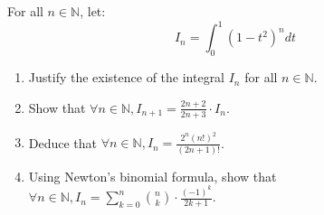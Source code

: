 \documentclass[12pt]{article}
\begin{document}
\newpage

\begin{answerbox}


\end{answerbox}

\newpage

\section{}
For all $n \in \mathbb{N}$, let:
$$I_n = \int_0^1 (1 - t^2)^n dt$$

\begin{enumerate}
    \item Justify the existence of the integral $I_n$ for all $n \in \mathbb{N}$.
    \item Show that $\forall n \in \mathbb{N}, I_{n+1} = \frac{2n + 2}{2n + 3} \cdot I_n$.
    \item Deduce that $\forall n \in \mathbb{N}, I_n = \frac{2^n(n!)^2}{(2n + 1)!}$.
    \item Using Newton's binomial formula, show that $\forall n \in \mathbb{N}, I_n = \sum_{k=0}^n \binom{n}{k} \cdot \frac{(-1)^k}{2k + 1}$.
\end{enumerate}

\newpage

\begin{answerbox}


\end{answerbox}

\newpage

\end{document}
